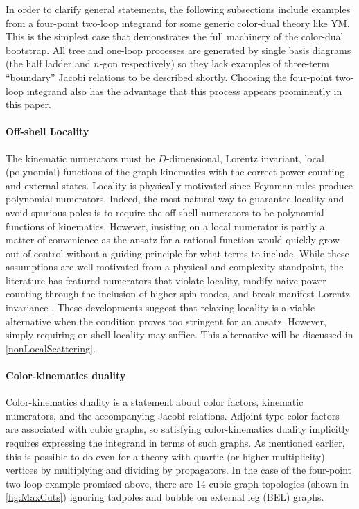 \documentclass[11pt,letter]{article}
\begin{document}
In order to clarify general statements, the following subsections
include examples from a four-point two-loop integrand for some generic
color-dual theory like YM.  This is the simplest case that
demonstrates the full machinery of the color-dual bootstrap.  All tree
and one-loop processes are generated by single basis diagrams (the half
ladder and $n$-gon respectively) so they lack examples of three-term
``boundary'' Jacobi relations to be described shortly.
Choosing the four-point two-loop integrand also has the advantage that this
process appears prominently in this paper.

\paragraph{Off-shell Locality}

The kinematic numerators must be $D$-dimensional, Lorentz invariant,
local (polynomial) functions of the graph kinematics with the correct
power counting and external states. Locality is physically motivated since Feynman
rules produce polynomial numerators. Indeed, the most natural way to guarantee locality and avoid spurious poles is to require the off-shell numerators to be polynomial functions of
kinematics. However, insisting on a local numerator is
partly a matter of convenience as the ansatz for a rational function
would quickly grow out of control without a guiding principle for what
terms to include.  While these
assumptions are well motivated from a physical and complexity
standpoint, the literature has featured numerators that violate
locality, modify naive power counting through the inclusion of higher
spin modes, and break manifest Lorentz invariance \cite{Square,
  WeinzierlBCJLagrangian, Mogull:2015adi, FivePointN4BCJ,
  Johansson:2017bfl, Ben-Shahar:2022ixa, Cheung:2016prv,
  Cheung:2021zvb}.  These developments suggest that relaxing locality
is a viable alternative when the condition proves too stringent for an
ansatz.  However, simply requiring on-shell locality may suffice.
This alternative will be discussed in \cref{nonLocalScattering}.


\paragraph{Color-kinematics duality}

Color-kinematics duality is a statement about color factors, kinematic
numerators, and the accompanying Jacobi relations.  Adjoint-type color
factors are associated with cubic graphs, so satisfying
color-kinematics duality implicitly requires expressing the integrand
in terms of such graphs. As mentioned earlier, this is possible to do
even for a theory with quartic (or higher multiplicity) vertices by
multiplying and dividing by propagators.  In the case of the four-point
two-loop example promised above, there are 14 cubic graph topologies
(shown in \cref{fig:MaxCuts}) ignoring tadpoles and bubble on external
leg (BEL) graphs.
\end{document}
